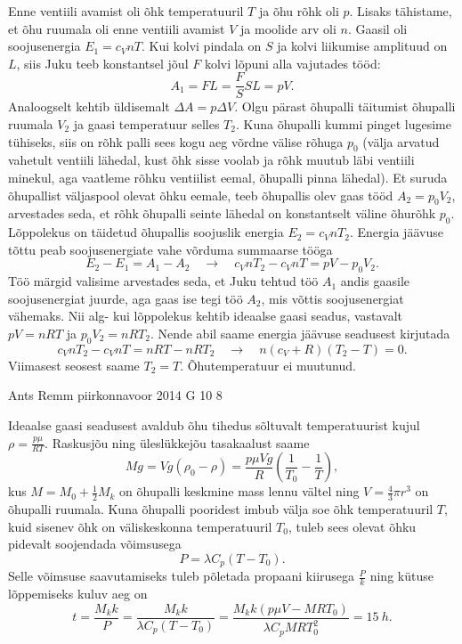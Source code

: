 \documentclass[11pt]{article}
\begin{document}
{{\ifSolution
Enne ventiili avamist oli õhk temperatuuril $T$ ja õhu rõhk oli $p$. Lisaks tähistame, et õhu ruumala oli enne ventiili avamist $V$ ja moolide arv oli $n$. Gaasil oli soojusenergia $E_1=c_VnT$. Kui kolvi pindala on $S$ ja kolvi liikumise amplituud on $L$, siis Juku teeb konstantsel jõul $F$ kolvi lõpuni alla vajutades tööd:
$$A_1=FL=\frac{F}{S}SL=pV.$$
Analoogselt kehtib üldisemalt $\Delta A = p \Delta V$. Olgu pärast õhupalli täitumist õhupalli ruumala $V_2$ ja gaasi temperatuur selles $T_2$. Kuna õhupalli kummi pinget lugesime tühiseks, siis on rõhk palli sees kogu aeg võrdne välise rõhuga $p_0$ (välja arvatud vahetult ventiili lähedal, kust õhk sisse voolab ja rõhk muutub läbi ventiili minekul, aga vaatleme rõhku ventiilist eemal, õhupalli pinna lähedal). Et suruda õhupallist väljaspool olevat õhku eemale, teeb õhupallis olev gaas tööd $A_2=p_0V_2$, arvestades seda, et rõhk õhupalli seinte lähedal on konstantselt väline õhurõhk $p_0$. Lõppolekus on täidetud õhupallis soojuslik energia $E_2=c_VnT_2$. Energia jäävuse tõttu peab soojusenergiate vahe võrduma summaarse tööga
$$E_2-E_1 = A_1-A_2 \quad\rightarrow\quad c_VnT_2-c_VnT = pV - p_0V_2.$$
Töö märgid valisime arvestades seda, et Juku tehtud töö $A_1$ andis gaasile soojusenergiat juurde, aga gaas ise tegi töö $A_2$, mis võttis soojusenergiat vähemaks. Nii alg- kui lõppolekus kehtib ideaalse gaasi seadus, vastavalt $pV=nRT$ ja $p_0V_2=nRT_2$. Nende abil saame energia jäävuse seadusest kirjutada
$$c_VnT_2-c_VnT = nRT-nRT_2 \quad\rightarrow\quad n(c_V+R)(T_2-T)=0.$$
Viimasest seosest saame $T_2=T$. Õhutemperatuur ei muutunud.
\fi
}

{Ants Remm} %
{piirkonnavoor} %
{2014} %
{G 10} %
{8} %
{

\ifSolution
Ideaalse gaasi seadusest avaldub õhu tihedus sõltuvalt temperatuurist kujul $\rho = \frac{p \mu}{R T}$. Raskusjõu ning üleslükkejõu tasakaalust saame
\[
M g = V g (\rho_0 - \rho) = \frac{p \mu V g}{R} (\frac{1}{T_0} - \frac{1}{T}),
\]
kus $M = M_0 + \frac{1}{2} M_k$ on õhupalli keskmine mass lennu vältel ning $V = \frac{4}{3} \pi r^3$ on õhupalli ruumala. Kuna õhupalli pooridest imbub välja soe õhk temperatuuril $T$, kuid sisenev õhk on väliskeskonna temperatuuril $T_0$, tuleb sees olevat õhku pidevalt soojendada võimsusega
\[
P = \lambda C_p (T - T_0).
\]
Selle võimsuse saavutamiseks tuleb põletada propaani kiirusega $\frac{P}{k}$ ning kütuse lõppemiseks kuluv aeg on
\[
t = \frac{M_k k}{P} = \frac{M_k k}{\lambda C_p (T - T_0)} = \frac{M_k k (p \mu V - M R T_0)}{\lambda C_p M R T_0^2} = \SI{15}{h}.
\]
\fi
}

}
\end{document}
